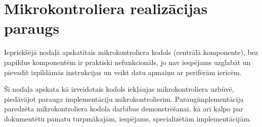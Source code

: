 \section{Mikrokontroliera realizācijas paraugs} \label{sec:uC}
	Iepriekšējā nodaļā apskatītais mikrokontroliera kodols (centrālā
	komponente), bez papildus komponentēm ir praktiski nefunkcionāls, jo
	nav iespējams uzglabāt un pievadīt izpildāmās instrukcijas un veikt
	datu apmaiņu ar perifērām ierīcēm.

	Šī nodaļa apskata kā izveidotais kodols iekļaujas
	mikrokontroliera uzbūvē, piedāvājot	parauga implementāciju
	mikrokontrolierim. 
	Paraug\-implementācija paredzēta mikrokontroliera kodola 
	darbības demonstrēšanai, kā arī kalpo par dokumentētu pamatu 
	turpmākajām, iespējams, specializētām implementācijām.
	
	
